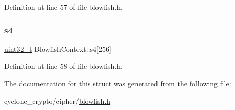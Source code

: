 Definition at line 57 of file blowfish.\+h.

\mbox{\label{structBlowfishContext_a752acc62c38eea0d09e491d2bd23d67e}} 
\subsubsection{\texorpdfstring{s4}{s4}}
{\footnotesize\ttfamily \hyperlink{stdint_8h_a435d1572bf3f880d55459d9805097f62}{uint32\+\_\+t} Blowfish\+Context\+::s4\mbox{[}256\mbox{]}}



Definition at line 58 of file blowfish.\+h.



The documentation for this struct was generated from the following file\+:\begin{DoxyCompactItemize}
\item 
cyclone\+\_\+crypto/cipher/\hyperlink{blowfish_8h}{blowfish.\+h}\end{DoxyCompactItemize}

